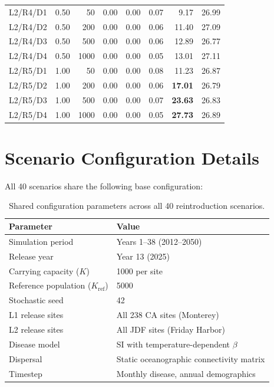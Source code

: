 \documentclass[11pt,a4paper]{article}
\begin{document}
\begin{small}
\begin{longtable}{llrrrrrr}
L2/R4/D1 & 0.50 & 50 & 0.00 & 0.00 & 0.07 & 9.17 & 26.99 \\
L2/R4/D2 & 0.50 & 200 & 0.00 & 0.00 & 0.06 & 11.40 & 27.09 \\
L2/R4/D3 & 0.50 & 500 & 0.00 & 0.00 & 0.06 & 12.89 & 26.77 \\
L2/R4/D4 & 0.50 & 1000 & 0.00 & 0.00 & 0.05 & 13.01 & 27.11 \\
\midrule
L2/R5/D1 & 1.00 & 50 & 0.00 & 0.00 & 0.08 & 11.23 & 26.87 \\
L2/R5/D2 & 1.00 & 200 & 0.00 & 0.00 & 0.06 & \textbf{17.01} & 26.79 \\
L2/R5/D3 & 1.00 & 500 & 0.00 & 0.00 & 0.07 & \textbf{23.63} & 26.83 \\
L2/R5/D4 & 1.00 & 1000 & 0.00 & 0.00 & 0.05 & \textbf{27.73} & 26.89 \\
\end{longtable}
\end{small}

\clearpage
\section{Scenario Configuration Details}

All 40 scenarios share the following base configuration:

\begin{table}[H]
\centering
\begin{tabular}{ll}
\toprule
\textbf{Parameter} & \textbf{Value} \\
\midrule
Simulation period & Years 1--38 (2012--2050) \\
Release year & Year 13 (2025) \\
Carrying capacity ($K$) & 1000 per site \\
Reference population ($K_\text{ref}$) & 5000 \\
Stochastic seed & 42 \\
L1 release sites & All 238 CA sites (Monterey) \\
L2 release sites & All JDF sites (Friday Harbor) \\
Disease model & SI with temperature-dependent $\beta$ \\
Dispersal & Static oceanographic connectivity matrix \\
Timestep & Monthly disease, annual demographics \\
\bottomrule
\end{tabular}
\caption{Shared configuration parameters across all 40 reintroduction scenarios.}
\label{tab:config}
\end{table}
\end{document}
